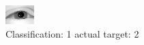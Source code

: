 \begin{figure}[h!]
\begin{center}
\includegraphics[width=0.60\columnwidth]{figures/ID2352_class_1_target_2.png}
\end{center}
\caption{ Classification: 1 actual target: 2}
\label{fig:ID2352_class_1_target_2}
\end{figure}
